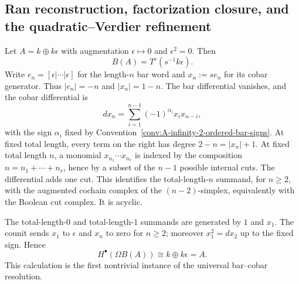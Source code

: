 \subsection{Ran reconstruction, factorization closure, and the
quadratic--Verdier refinement}

\begin{computation}
\label{comp:A-square-zero-bar-cobar}
Let $A=k\oplus k\epsilon$ with augmentation
$\epsilon\mapsto0$ and $\epsilon^2=0$.  Then
\[
 B(A)=T^c(s^{-1}k\epsilon).
\]
Write $e_n=[\epsilon|\cdots|\epsilon]$ for the length-$n$ bar word and
$x_n:=s e_n$ for its cobar generator.  Thus $|e_n|=-n$ and
$|x_n|=1-n$.  The bar differential vanishes,
and the cobar differential is
\[
 d x_n=\sum_{i=1}^{n-1}(-1)^{\alpha_i}x_i x_{n-i},
\]
with the sign $\alpha_i$ fixed by
Convention~\ref{conv:A-infinity-2-ordered-bar-signs}.  At fixed total
length, every term on the right has degree $2-n=|x_n|+1$.  At fixed total
length $n$, a monomial
$x_{n_1}\cdots x_{n_r}$ is indexed by the composition
$n=n_1+\cdots+n_r$, hence by a subset of the $n-1$ possible internal
cuts.  The differential adds one cut.  This identifies the
total-length-$n$ summand, for $n\geq2$, with the augmented cochain
complex of the $(n-2)$-simplex, equivalently with the Boolean cut
complex.  It is acyclic.

The total-length-$0$ and total-length-$1$ summands are generated by
$1$ and $x_1$.  The counit sends $x_1$ to $\epsilon$ and $x_n$ to zero
for $n\geq2$; moreover $x_1^2=d x_2$ up to the fixed sign.  Hence
\[
 H^\bullet(\Omega B(A))\cong k\oplus k\epsilon=A.
\]
This calculation is the first nontrivial instance of the universal
bar--cobar resolution.
\end{computation}

